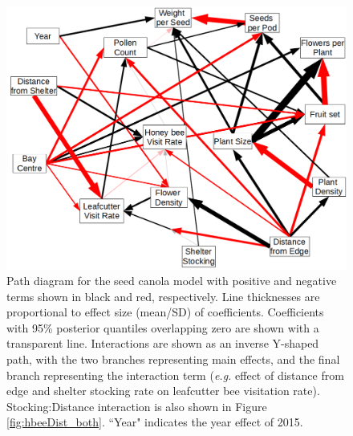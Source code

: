 \begin{figure}
	\includegraphics[width=\textwidth,keepaspectratio=true]{seed_sem.png}
    \caption[Path diagram for seed canola model]{Path diagram for the seed canola model with positive and negative terms shown in black and red, respectively. Line thicknesses are proportional to effect size (mean/SD) of coefficients. Coefficients with 95\% posterior quantiles overlapping zero are shown with a transparent line. Interactions are shown as an inverse Y-shaped path, with the two branches representing main effects, and the final branch representing the interaction term (\textit{e.g.} effect of distance from edge and shelter stocking rate on leafcutter bee visitation rate). Stocking:Distance interaction is also shown in Figure \ref{fig:hbeeDist_both}. ``Year" indicates the year effect of 2015.}
    \label{fig:seedSEM}
\end{figure}